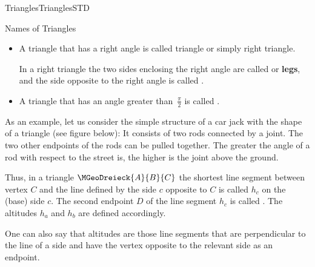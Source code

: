 \begin{MXContent}{Triangles}{Triangles}{STD}
\begin{MXInfo}{Names of Triangles}
\begin{itemize}
 \item A triangle that has a right angle is called  
  triangle or simply right triangle.

  In a right triangle the two sides enclosing the right angle are called 
   or \textbf{legs}, and the side opposite to the right angle
  is called .    

 \item A triangle that has an angle greater than~$\frac{\pi}{2}$ is called 
  .
\end{itemize}
\end{MXInfo}

As an example, let us consider the simple structure of a car jack with the shape of a triangle (see figure below):
It consists of two rods connected by a joint. The two other endpoints of the rods can be pulled 
together. The greater the angle of a rod with respect to the street is, the higher is the joint 
above the ground.

\begin{center}
\end{center}

Thus, in a triangle $\MGeoDreieck{A}{B}{C}$ the shortest line segment between vertex $C$ and 
the line defined by the side $c$ opposite to $C$ is called  
 $h_c$ on the (base) side $c$.
The second endpoint $D$ of the line segment $h_c$ is called 
. The altitudes $h_a$ and 
$h_b$ are defined accordingly.

One can also say that altitudes are those line segments that are perpendicular to the 
line of a side and have the vertex opposite to the relevant side as an endpoint. 
\end{MXContent}


